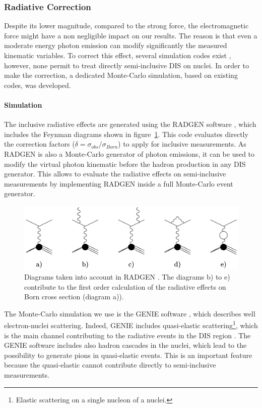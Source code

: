 \subsubsection{Radiative Correction}
\label{RadCor}



Despite its lower magnitude, compared to the strong force, the 
electromagnetic force might have a non negligible impact on our results. The 
reason is that even a moderate energy photon 
emission can modify significantly the measured kinematic variables.
To correct this effect, several simulation codes exist \cite{Akushevich:2001yp}, 
however, none permit to treat directly semi-inclusive DIS on nuclei. In order 
to make the correction, a dedicated Monte-Carlo simulation, based on existing 
codes, was developed.

\paragraph{Simulation}

The inclusive radiative effects are generated using the RADGEN software 
\cite{Akushevich:1998ft}, which includes the Feynman diagrams shown in 
figure~\ref{fig:FDRadCorr}. This code evaluates directly the correction 
factors ($\delta = \sigma_{obs} / \sigma_{Born}$) to apply for inclusive 
measurements. As RADGEN is also a Monte-Carlo generator of photon emissions, 
it can be used to modify the virtual photon kinematic before the 
hadron production in any DIS generator. This allows to evaluate the radiative 
effects on semi-inclusive measurements by implementing RADGEN inside a full 
Monte-Carlo event generator.

\begin{figure}[htbp]
\centering
\includegraphics[width=12cm] {chap5-fig/RadDiag.png}
\caption {Diagrams taken into account in RADGEN \cite{Akushevich:1998ft}. The 
diagrams b) to e) contribute to the first order calculation of the radiative 
effects on Born cross section (diagram a)).}
\label{fig:FDRadCorr}
\end{figure}

The Monte-Carlo simulation we use is the GENIE software 
\cite{Andreopoulos:2009rq}, which describes well electron-nuclei scattering. 
Indeed, GENIE includes quasi-elastic scattering\footnote{Elastic 
scattering on a single nucleon of a nuclei.}, which is the main channel contributing 
to the radiative events in the DIS region \cite{Akushevich:2007jc}. The GENIE 
software includes also hadron cascades in the nuclei, which lead to the 
possibility to generate pions in quasi-elastic events. This is an important 
feature because the quasi-elastic cannot contribute directly to semi-inclusive 
measurements.

